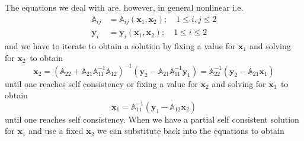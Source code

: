 \documentclass[aps,preprint]{revtex4}%
\begin{document}
The equations we deal with are, however, in general nonlinear i.e.
\begin{align}
\mathbb{A}_{ij}  &  =\mathbb{A}_{ij}\left(  \mathbf{x}_{1},\mathbf{x}%
_{2}\right)  ;\quad1\leq i,j\leq2\nonumber\\
\mathbf{y}_{i}  &  =\mathbf{y}_{i}\left(  \mathbf{x}_{1},\mathbf{x}%
_{2}\right)  ;\quad1\leq i\leq2
\end{align}
and we have to iterate to obtain a solution by fixing a value for
$\mathbf{x}_{1}$ and solving for $\mathbf{x}_{2\text{ }}$to obtain
\begin{equation}
\mathbf{x}_{2}=\left(  \mathbb{A}_{22}+\mathbb{A}_{21}\mathbb{A}_{11}%
^{-1}\mathbb{A}_{12}\right)  ^{-1}\left(  \mathbf{y}_{2}-\mathbb{A}%
_{21}\mathbb{A}_{11}^{-1}\mathbf{y}_{1}\right)  =\mathbb{A}_{22}^{-1}\left(
\mathbf{y}_{2}-\mathbb{A}_{21}\mathbf{x}_{1}\right)  \label{x2parteq}%
\end{equation}
until one reaches self consistency or fixing a value for $\mathbf{x}_{2}$ and
solving for $\mathbf{x}_{1\text{ }}$to obtain%
\begin{equation}
\mathbf{x}_{1}=\mathbb{A}_{11}^{-1}\left(  \mathbf{y}_{1}-\mathbb{A}%
_{12}\mathbf{x}_{2}\right)  \label{x1parteq}%
\end{equation}
until one reaches self consistency. When we have a partial self consistent
solution for $\mathbf{x}_{1}$ and use a fixed $\mathbf{x}_{2}$ we can
substitute back into the equations to obtain
\end{document}
